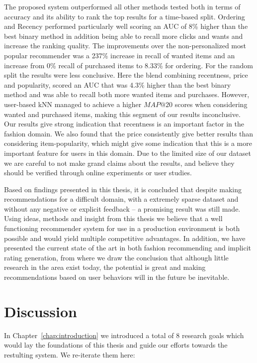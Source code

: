 The proposed system outperformed all other methods tested both in terms of
accuracy and its ability to rank the top results for a time-based split.
Ordering and Recency performed particularly well scoring an AUC of 8\% higher
than the best binary method in addition being able to recall more clicks and
wants and increase the ranking quality. The improvements over the
non-personalized most popular recommender was a 237\% increase in recall of
wanted items and an increase from 0\% recall of purchased items to 8.33\% for
ordering. For the random split the results were less conclusive.  Here the
blend combining recentness, price and popularity, scored an AUC that was 4.3\%
higher than the best binary method and was able to recall both more wanted
items and purchases. However, user-based kNN managed to achieve a higher
$MAP@20$ scores when considering wanted and purchased items, making this
segment of our results inconclusive. Our results give strong indication that
recentness is an important factor in the fashion domain. We also found that the
price consistently give better results than considering item-popularity,
which might give some indication that this is a more important feature for
users in this domain. Due to the limited size of our dataset we are careful to
not make grand claims about the results, and believe they should be verified
through online experiments or user studies.

Based on findings presented in this thesis, it is concluded that despite making
recommendations for a difficult domain, with a extremely sparse dataset and
without any negative or explicit feedback -- a promising result was still made.
Using ideas, methods and insight from this thesis we believe that a well
functioning recommender system for use in a production environment is both
possible and would yield multiple competitive advantages. In addition, we have
presented the current state of the art in both fashion recommending and
implicit rating generation, from where we draw the conclusion that although
little research in the area exist today, the potential is great and making
recommendations based on user behaviors will in the future be inevitable.

\section{Discussion}

In Chapter~\ref{chap:introduction} we introduced a total of 8 research goals
which would lay the foundations of this thesis and guide our efforts towards
the restulting system. We re-iterate them here:

